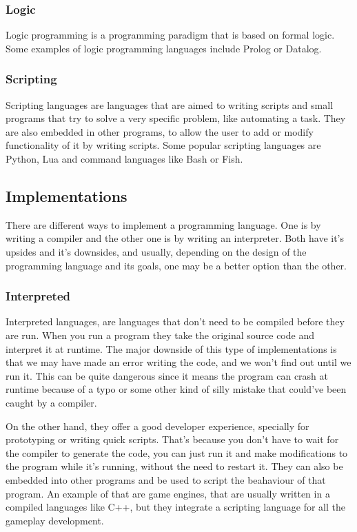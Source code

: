 ﻿\documentclass[10pt,a4paper,twocolumn,twoside]{article}
\begin{document}
\subsubsection{Logic}
Logic programming is a programming paradigm that is based on formal logic. 
Some examples of logic programming languages include Prolog or Datalog.

\subsubsection{Scripting}
Scripting languages are languages that are aimed to writing scripts and small
programs that try to solve a very specific problem, like automating a task. They
are also embedded in other programs, to allow the user to add or modify
functionality of it by writing scripts. Some popular scripting languages are 
Python, Lua and command languages like Bash or Fish.

\subsection{Implementations}
There are different ways to implement a programming language. One is by writing
a compiler and the other one is by writing an interpreter. Both have it's
upsides and it's downsides, and usually, depending on the design of the
programming language and its goals, one may be a better option than the other.

\subsubsection{Interpreted}
Interpreted languages, are languages that don't need to be compiled before they
are run. When you run a program they take the original source code and interpret
it at runtime. The major downside of this type of implementations is that we may
have made an error writing the code, and we won't find out until we run it. This
can be quite dangerous since it means the program can crash at runtime because
of a typo or some other kind of silly mistake that could've been caught by a
compiler.

On the other hand, they offer a good developer experience, specially for
prototyping or writing quick scripts. That's because you don't have to wait for
the compiler to generate the code, you can just run it and make modifications to
the program while it's running, without the need to restart it. They can also be
embedded into other programs and be used to script the beahaviour of that
program. An example of that are game engines, that are usually written in a
compiled languages like C++, but they integrate a scripting language for all the
gameplay development.
\end{document}
